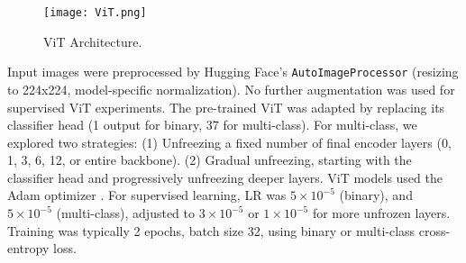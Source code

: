 \documentclass{article}
\begin{document}
\begin{figure}[h]
    \centering
    \texttt{[image: ViT.png]}
    \caption{ViT Architecture.}
    \label{fig:vit_architecture}
\end{figure}

Input images were preprocessed by Hugging Face's \texttt{AutoImageProcessor} (resizing to 224x224, model-specific normalization). No further augmentation was used for supervised ViT experiments. The pre-trained ViT was adapted by replacing its classifier head (1 output for binary, 37 for multi-class). For multi-class, we explored two strategies: (1) Unfreezing a fixed number of final encoder layers (0, 1, 3, 6, 12, or entire backbone). (2) Gradual unfreezing, starting with the classifier head and progressively unfreezing deeper layers. ViT models used the Adam optimizer \citep{kingma2014adam}. For supervised learning, LR was $5 \times 10^{-5}$ (binary), and $5 \times 10^{-5}$ (multi-class), adjusted to $3 \times 10^{-5}$ or $1 \times 10^{-5}$ for more unfrozen layers. Training was typically 2 epochs, batch size 32, using binary or multi-class cross-entropy loss.


\end{document}
